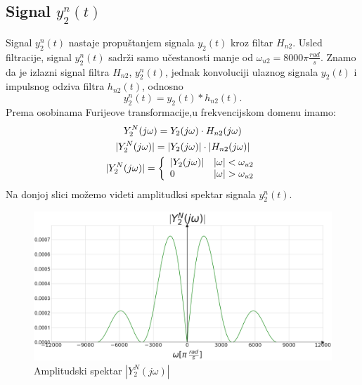 \documentclass[titlepage,a4paper,12pt]{article}
\begin{document}
	\subsection{Signal $y_2^n(t)$}
	Signal $y_2^n(t)$ nastaje propuštanjem signala $y_2(t)$ kroz filtar $H_{n2}$. 
	Usled filtracije, signal $y_2^n(t)$ sadrži samo učestanosti manje od $\omega_{u2} = 8000\pi\frac{rad}{s}$. Znamo da je izlazni signal filtra $H_{n2}$, $y_2^n(t)$, jednak konvoluciji ulaznog signala $y_2(t)$ i impulsnog odziva filtra $h_{n2}(t)$, odnosno
	\begin{equation}
		y_2^n(t) = y_2(t) * h_{n2}(t).
	\end{equation}
	Prema osobinama Furijeove transformacije,u frekvencijskom domenu imamo:
	\begin{gather}
		Y_2^N(j\omega) = Y_2(j\omega)\cdot H_{n2}(j\omega)\\
		|Y_2^N(j\omega)| = |Y_2(j\omega)|\cdot |H_{n2}(j\omega)|\notag\\
		|Y_2^N(j\omega)| = \left\{\begin{array}{lll}
			|Y_2(j\omega)| &|\omega| < \omega_{u2} \\
			0 &|\omega| > \omega_{u2}
		\end{array}\right.
	\end{gather}
	Na donjoj slici možemo videti amplitudksi spektar signala $y_2^n(t)$.
	\begin{figure}[ht]
		\centering
		\includegraphics[width=\textwidth]{Images/AmpY2N.png}
		\caption{Amplitudski spektar $|Y_2^N(j\omega)|$}\label{fig:AmpY2N}
	\end{figure}
	\FloatBarrier
	\clearpage
	
\end{document}
